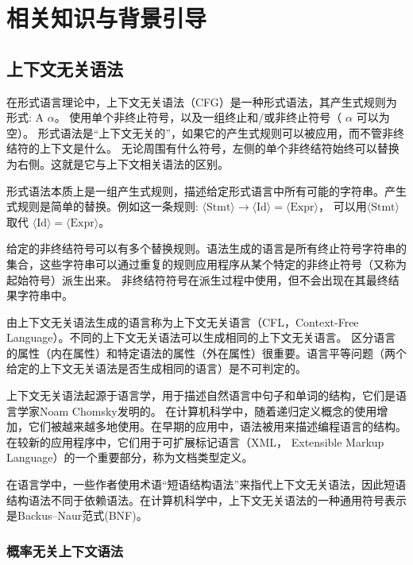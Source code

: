 
\chapter{相关知识与背景引导}


\section{上下文无关语法}

在形式语言理论中，上下文无关语法（CFG）是一种形式语法，其产生式规则为形式: A \rightarrow $\alpha$。
使用单个非终止符号，以及一组终止和/或非终止符号（ $\alpha$ 可以为空）。
形式语法是“上下文无关的”，如果它的产生式规则可以被应用，而不管非终结符的上下文是什么。
无论周围有什么符号，左侧的单个非终结符始终可以替换为右侧。这就是它与上下文相关语法的区别。

形式语法本质上是一组产生式规则，描述给定形式语言中所有可能的字符串。产生式规则是简单的替换。例如这一条规则: $\displaystyle \langle {\text{Stmt}}\rangle \to \langle {\text{Id}}\rangle =\langle {\text{Expr}}\rangle$，
可以用$\displaystyle \langle {\text{Stmt}}\rangle$ 取代 $\langle {\text{Id}}\rangle =\langle {\text{Expr}}\rangle$。

给定的非终结符号可以有多个替换规则。语法生成的语言是所有终止符号字符串的集合，这些字符串可以通过重复的规则应用程序从某个特定的非终止符号（又称为起始符号）派生出来。
非终结符符号在派生过程中使用，但不会出现在其最终结果字符串中。

由上下文无关语法生成的语言称为上下文无关语言（CFL，Context-Free Language）。不同的上下文无关语法可以生成相同的上下文无关语言。
区分语言的属性（内在属性）和特定语法的属性（外在属性）很重要。语言平等问题（两个给定的上下文无关语法是否生成相同的语言）是不可判定的。

上下文无关语法起源于语言学，用于描述自然语言中句子和单词的结构，它们是语言学家Noam Chomsky发明的。
在计算机科学中，随着递归定义概念的使用增加，它们被越来越多地使用。在早期的应用中，语法被用来描述编程语言的结构。
在较新的应用程序中，它们用于可扩展标记语言（XML， Extensible Markup Language）的一个重要部分，称为文档类型定义\cite{hopcroft2001introduction}。

在语言学中，一些作者使用术语“短语结构语法”来指代上下文无关语法，因此短语结构语法不同于依赖语法。在计算机科学中，上下文无关语法的一种通用符号表示是Backus–Naur范式(BNF)。

\subsection{概率无关上下文语法}

